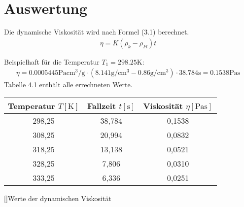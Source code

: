 \chapter{Auswertung}
	Die dynamische Viskosität wird nach Formel (3.1) berechnet.
    \begin{align*}
    	\eta = K (\rho_k - \rho_{Fl})t 
    \end{align*}
    
    Beispielhaft für die Temperatur $T_1 = 298.25 \si{\kelvin}$:
    \begin{align*}
    	\eta = 0.0005445 \si{\pascal\centi\metre^3\per\gram}\cdot (8.141 \si{\gram\per\centi\metre^3} - 0.86 \si{\gram\per\centi\metre^3})\cdot 38.784 \si{\second} = 0.1538 \si{\pascal\second}
    \end{align*}
   Tabelle 4.1 enthält alle errechneten Werte. 
   \begin{center}
   \begin{tabular}{c|c|c}
  		Temperatur $T [\si{\kelvin}]$ & Fallzeit $t [\si{\second}]$ & Viskosität $\eta [\si{\pascal\second}]$ \\ \hline \hline
        298,25 & 38,784	& 0,1538 \\
		308,25 & 20,994	& 0,0832 \\
		318,25 & 13,138	& 0,0521 \\
		328,25 & 7,806	& 0,0310 \\
		333,25 & 6,336	& 0,0251 \\
   \end{tabular}
   []{Werte der dynamischen Viskosität}
   \end{center}
   
